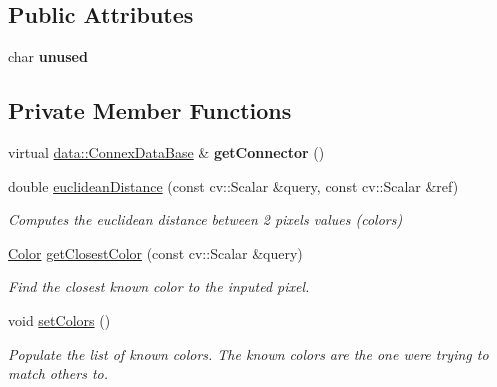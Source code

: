 \subsection*{Public Attributes}
\begin{DoxyCompactItemize}
\item 
\mbox{\label{classfilter_1_1algos_1_1_closest_color_a3be4d2d0e5e64eeb3ea95debe8f2acf6}} 
char {\bfseries unused}
\end{DoxyCompactItemize}
\subsection*{Private Member Functions}
\begin{DoxyCompactItemize}
\item 
\mbox{\label{classfilter_1_1algos_1_1_closest_color_ac519bcd4e457d573f901453ae2ce9723}} 
virtual \hyperlink{classfilter_1_1data_1_1_connex_data_base}{data\+::\+Connex\+Data\+Base} \& {\bfseries get\+Connector} ()
\item 
double \hyperlink{classfilter_1_1algos_1_1_closest_color_ac89955e42d78860343ab1c13b6458ec7}{euclidean\+Distance} (const cv\+::\+Scalar \&query, const cv\+::\+Scalar \&ref)
\begin{DoxyCompactList}\small\item\em Computes the euclidean distance between 2 pixels values (colors) \end{DoxyCompactList}\item 
\hyperlink{structfilter_1_1algos_1_1_closest_color_1_1_color}{Color} \hyperlink{classfilter_1_1algos_1_1_closest_color_a30005f784dfc4d74e5ebd4f67dd85bd7}{get\+Closest\+Color} (const cv\+::\+Scalar \&query)
\begin{DoxyCompactList}\small\item\em Find the closest known color to the inputed pixel. \end{DoxyCompactList}\item 
\mbox{\label{classfilter_1_1algos_1_1_closest_color_a3bb040cceb1e8f799a89dae3c1339477}} 
void \hyperlink{classfilter_1_1algos_1_1_closest_color_a3bb040cceb1e8f799a89dae3c1339477}{set\+Colors} ()
\begin{DoxyCompactList}\small\item\em Populate the list of known colors. The known colors are the one we\textquotesingle{}re trying to match others to. \end{DoxyCompactList}\end{DoxyCompactItemize}
